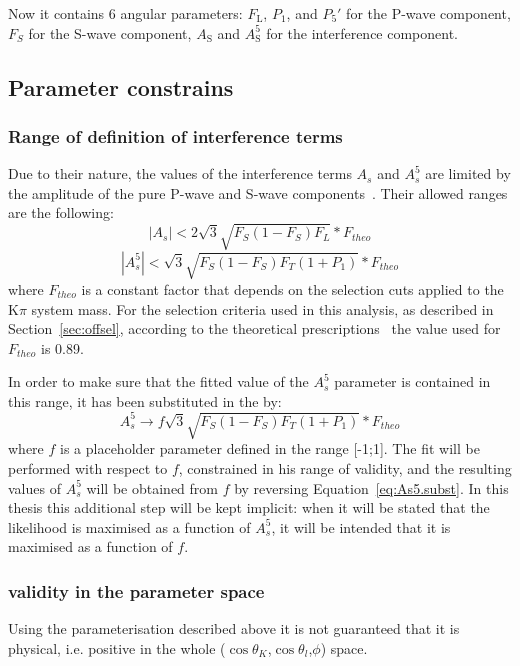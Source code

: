 Now it contains 6 angular parameters: $F_\mathrm{L}$, $P_1$, and $P_5'$ for the P-wave component, $F_S$ for the S-wave component, $A_\mathrm{S}$ and $A^5_\mathrm{S}$ for the interference component.

\subsection{Parameter constrains}
\label{sec:bound}

\subsubsection{Range of definition of interference terms}
\label{sec:As5.range}
Due to their nature, the values of the interference terms $A_s$ and $A_s^5$ are limited by the amplitude of the pure P-wave and S-wave components~\cite{Genon:Swave}.
Their allowed ranges are the following:
\begin{equation} \label{eq:As.range}
  |A_s|<2\sqrt{3}\sqrt{F_S(1-F_S)F_L}*F_{theo}
\end{equation}
\begin{equation} \label{eq:As5.range}
  |A^5_s|<\sqrt{3}\sqrt{F_S(1-F_S)F_T(1+P_1)}*F_{theo}
\end{equation}
where $F_{theo}$ is a constant factor that depends on the selection cuts applied to the $\mathrm{K}\pi$ system mass.
For the selection criteria used in this analysis, as described in Section~\ref{sec:offsel}, according to the theoretical prescriptions~\cite{Genon:Swave} the value used for $F_{theo}$ is 0.89.

In order to make sure that the fitted value of the $A_s^5$ parameter is contained in this range, it has been substituted in the \pdf by:
\begin{equation} \label{eq:As5.subst}
  A^5_s\to f\sqrt{3}\sqrt{F_S(1-F_S)F_T(1+P_1)}*F_{theo}
\end{equation}
where $f$ is a placeholder parameter defined in the range [-1;1].
The fit will be performed with respect to $f$, constrained in his range of validity, and the resulting values of $A_s^5$ will be obtained from $f$ by reversing Equation~\ref{eq:As5.subst}.
In this thesis this additional step will be kept implicit: when it will be stated that the likelihood is maximised as a function of $A_s^5$, it will be intended that it is maximised as a function of $f$.

\subsubsection{\pdf validity in the parameter space}
\label{sec:phys.bound}
Using the \pdf parameterisation described above it is not guaranteed that it is physical, i.e. positive in the whole ($\cos\theta_K$,$\cos\theta_l$,$\phi$) space.


